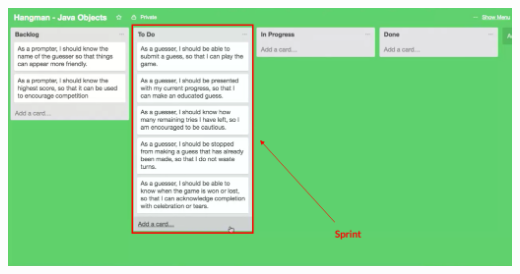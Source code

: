 \documentclass[12pt]{article}
\begin{document}
\begin{itemize}
    \begin{center}
    \includegraphics[width=\linewidth]{images/part_3_notes_3.png}
    \end{center}
\end{itemize}
\end{document}
